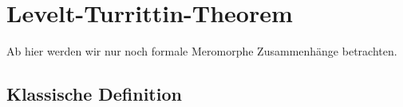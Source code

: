 \chapter{Levelt-\!Turrittin-\!Theorem}
\begin{comment}
  Quellen:\\
  sabbah\_cimpa90 seite 28 / 30
\end{comment}

Ab hier werden wir nur noch formale Meromorphe Zusammenhänge betrachten. 

\begin{comment}
  Sei $M_{\hat{K}}=\cD_{\hat{K}}/\cD_{\hat{K}}\cdot P$ und nehme an, dass $N(P)$
  zumindes 2 nichttriviale Steigungen hat. Spalte $N(P)=N_1\dot\cup N_2$ in 2
  Teile. Dann gilt:

  \begin{lem}
    Es existiert eine Aufteilung $P=P_1P_2$ mit:
    \begin{itemize}
      \item $N(P_1)\subset N_1$ und $N(P_2)\subset N_2$
      \item A ist eine kante von ...
    \end{itemize}
  \end{lem}
\end{comment}

\section{Klassische Definition}

